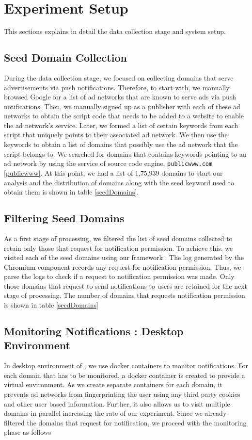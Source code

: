 \section{Experiment Setup}
This sections explains in detail the data collection stage and system setup.

\subsection{Seed Domain Collection}
During the data collection stage, we focused on collecting domains that serve advertisements via push notifications. Therefore, to start with, we manually browsed Google for a list of ad networks that are known to serve ads via push notifications. Then, we manually signed up as a publisher with each of these ad networks to obtain the script code that needs to be added to a website to enable the ad network's service. Later, we formed a list of certain keywords from each script that uniquely points to their associated ad network. We then use the keywords to obtain a list of domains that possibly use the ad network that the script belongs to. We searched for domains that contains keywords pointing to an ad network by using the service of source code engine, \texttt{publicwww.com} \ref{publicwww}. At this point, we had a list of 1,75,939 domains to start our analysis and the distribution of domains along with the seed keyword used to obtain them is shown in table \ref{seedDomains}.



\subsection{Filtering Seed Domains}
As a first stage of processing, we filtered the list of seed domains collected to retain only those that request for notification permission. To achieve this, we visited each of the seed domains using our framework \sysname. The log generated by the Chromium component records any request for notification permission. Thus, we parse the logs to check if a request to notification permission was made. Only those domains that request to send notifications to users are retained for the next stage of processing. The number of domains that requests notification permission is shown in table \ref{seedDomains}

\subsection{Monitoring Notifications : Desktop Environment}
In desktop environment of \sysname, we use docker containers  to monitor notifications. For each domain that has to be monitored, a docker container is created to provide a virtual environment. As we create separate containers for each domain, it prevents ad networks from fingerprinting the user using any third party cookies and other user based information. Further, it also allows us to visit multiple domains in parallel increasing the rate of our experiment. Since we already filtered the domains that request for notification, we proceed with the monitoring phase as follows

